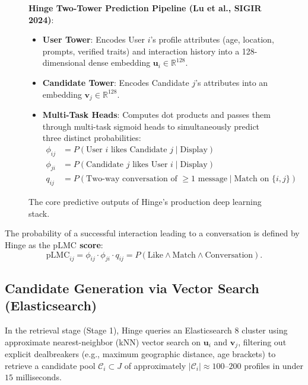 \documentclass[11pt,letterpaper]{article}
\theoremstyle{definition}
\theoremstyle{plain}
\theoremstyle{remark}
\begin{document}
\begin{figure}[htbp]
\centering
\begin{tcolorbox}[colback=gray!5!white,colframe=gray!60!black,arc=2mm,width=0.95\textwidth]
\small
\textbf{Hinge Two-Tower Prediction Pipeline (Lu et al., SIGIR 2024)}:
\begin{itemize}[leftmargin=1.5em]
    \item \textbf{User Tower}: Encodes User $i$'s profile attributes (age, location, prompts, verified traits) and interaction history into a 128-dimensional dense embedding $\mathbf{u}_i \in \mathbb{R}^{128}$.
    \item \textbf{Candidate Tower}: Encodes Candidate $j$'s attributes into an embedding $\mathbf{v}_j \in \mathbb{R}^{128}$.
    \item \textbf{Multi-Task Heads}: Computes dot products and passes them through multi-task sigmoid heads to simultaneously predict three distinct probabilities:
    \begin{align}
        \phi_{ij} &= P(\text{User } i \text{ likes Candidate } j \mid \text{Display}) \tag{Swipe Probability} \\
        \phi_{ji} &= P(\text{Candidate } j \text{ likes User } i \mid \text{Display}) \tag{Reciprocal Probability} \\
        q_{ij} &= P(\text{Two-way conversation of } \ge 1 \text{ message} \mid \text{Match on } \{i, j\}) \tag{Conversation Quality}
    \end{align}
\end{itemize}
\end{tcolorbox}
\caption{The core predictive outputs of Hinge's production deep learning stack.}
\label{fig:hinge_stack}
\end{figure}

The probability of a successful interaction leading to a conversation is defined by Hinge as the \textbf{$\mathrm{pLMC}$ score}:
\begin{equation}
    \mathrm{pLMC}_{ij} = \phi_{ij} \cdot \phi_{ji} \cdot q_{ij} = P(\text{Like} \land \text{Match} \land \text{Conversation}).
\end{equation}

\subsection{Candidate Generation via Vector Search (Elasticsearch)}
In the retrieval stage (Stage 1), Hinge queries an Elasticsearch 8 cluster using approximate nearest-neighbor (kNN) vector search on $\mathbf{u}_i$ and $\mathbf{v}_j$, filtering out explicit dealbreakers (e.g., maximum geographic distance, age brackets) to retrieve a candidate pool $\mathcal{C}_i \subset J$ of approximately $|\mathcal{C}_i| \approx 100\text{--}200$ profiles in under $15$ milliseconds.
\end{document}
